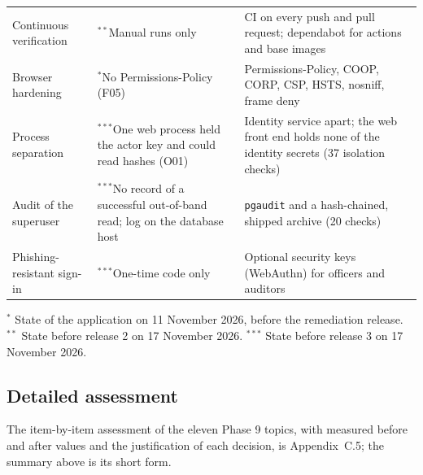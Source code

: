 \documentclass[10pt,a4paper]{article}
\newcommand{\code}[1]{\nolinkurl{#1}}
\begin{document}
\begin{center}
\begin{tabularx}{\linewidth}{@{}L{3.3cm}L{3.7cm}Y@{}}
Continuous verification & $^{**}$Manual runs only & CI on every push and pull request; dependabot for actions and base images\\
Browser hardening & $^{*}$No Permissions-Policy (F05) & Permissions-Policy, COOP, CORP, CSP, HSTS, nosniff, frame deny\\
Process separation & $^{***}$One web process held the actor key and could read hashes (O01) & Identity service apart; the web front end holds none of the identity secrets (37 isolation checks)\\
Audit of the superuser & $^{***}$No record of a successful out-of-band read; log on the database host & \code{pgaudit} and a hash-chained, shipped archive (20 checks)\\
Phishing-resistant sign-in & $^{***}$One-time code only & Optional security keys (WebAuthn) for officers and auditors\\
\bottomrule\end{tabularx}\end{center}
\footnotesize $^{*}$ State of the application on 11 November 2026, before the remediation release. $^{**}$ State before release 2 on 17 November 2026. $^{***}$ State before release 3 on 17 November 2026.\normalsize

\subsection{Detailed assessment}
The item-by-item assessment of the eleven Phase 9 topics, with measured before and after values and the justification of each decision, is Appendix~C.5; the summary above is its short form.
\end{document}
